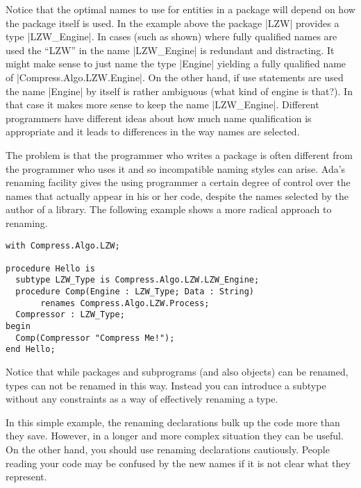 Notice that the optimal names to use for entities in a package will depend on how the package
itself is used. In the example above the package |LZW| provides a type |LZW_Engine|. In cases
(such as shown) where fully qualified names are used the ``LZW'' in the name |LZW_Engine| is
redundant and distracting. It might make sense to just name the type |Engine| yielding a fully
qualified name of |Compress.Algo.LZW.Engine|. On the other hand, if use statements are used the
name |Engine| by itself is rather ambiguous (what kind of engine is that?). In that case it
makes more sense to keep the name |LZW_Engine|. Different programmers have different ideas about
how much name qualification is appropriate and it leads to differences in the way names are
selected.

The problem is that the programmer who writes a package is often different from the programmer
who uses it and so incompatible naming styles can arise. Ada's renaming facility gives the using
programmer a certain degree of control over the names that actually appear in his or her code,
despite the names selected by the author of a library. The following example shows a more
radical approach to renaming.

\begin{lstlisting}
with Compress.Algo.LZW;

procedure Hello is
  subtype LZW_Type is Compress.Algo.LZW.LZW_Engine;
  procedure Comp(Engine : LZW_Type; Data : String)
       renames Compress.Algo.LZW.Process;
  Compressor : LZW_Type;
begin
  Comp(Compressor "Compress Me!");
end Hello;
\end{lstlisting}

Notice that while packages and subprograms (and also objects) can be renamed, types can not be
renamed in this way. Instead you can introduce a subtype without any constraints as a way of
effectively renaming a type.

In this simple example, the renaming declarations bulk up the code more than they save. However,
in a longer and more complex situation they can be useful. On the other hand, you should use
renaming declarations cautiously. People reading your code may be confused by the new names if
it is not clear what they represent.

